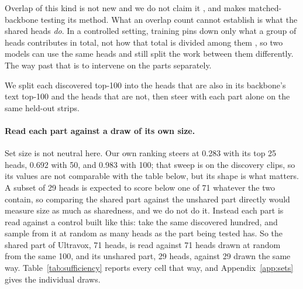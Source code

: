 \documentclass[11pt]{article}
\begin{document}
Overlap of this kind is not new and we do not claim it
\citep{li2026intrinsic,choi2026truth,park2026vrh,bektursun2026borrowed}, and
\citet{cascade2026} makes matched-backbone testing its method. What an overlap
count cannot establish is what the shared heads \emph{do}. In a controlled setting, training pins down only what a group of heads
contributes in total, not how that total is divided among them
\citep{computationalunit2026}, so two models can use the same heads and still
split the work between them differently. The way past that is to intervene on the parts separately.

We split each discovered top-100 into the heads that are also in its backbone's
text top-100 and the heads that are not, then steer with each part alone on the
same held-out strips.

\paragraph{Read each part against a draw of its own size.}
Set size is not neutral here. Our own ranking steers at 0.283 with its top 25
heads, 0.692 with 50, and 0.983 with 100; that sweep is on the discovery clips,
so its values are not comparable with the table below, but its shape is what
matters. A subset of 29 heads is expected to score below one of 71 whatever the
two contain, so comparing the shared part against the unshared part directly
would measure size as much as sharedness, and we do not do it. Instead each part is read against a control built like this:
take the same discovered hundred, and sample from it at random as many heads as
the part being tested has. So the shared part of Ultravox, 71 heads, is read
against 71 heads drawn at random from the same 100, and its unshared part, 29
heads, against 29 drawn the same way. Table~\ref{tab:sufficiency} reports every
cell that way, and Appendix~\ref{app:sets} gives the individual draws.
\end{document}
